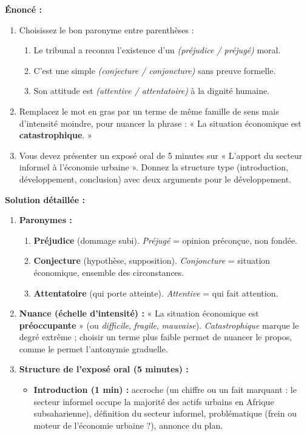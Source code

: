 \documentclass[11pt]{article}
\begin{document}
\begin{exoresolu}
\textbf{Énoncé :}
\begin{enumerate}
    \item Choisissez le bon paronyme entre parenthèses :
    \begin{enumerate}
        \item Le tribunal a reconnu l'existence d'un \emph{(préjudice / préjugé)} moral.
        \item C'est une simple \emph{(conjecture / conjoncture)} sans preuve formelle.
        \item Son attitude est \emph{(attentive / attentatoire)} à la dignité humaine.
    \end{enumerate}
    \item Remplacez le mot en gras par un terme de même famille de sens mais d'intensité moindre, pour nuancer la phrase : « La situation économique est \textbf{catastrophique}. »
    \item Vous devez présenter un exposé oral de 5 minutes sur « L'apport du secteur informel à l'économie urbaine ». Donnez la structure type (introduction, développement, conclusion) avec deux arguments pour le développement.
\end{enumerate}
\tcblower
\textbf{Solution détaillée :}
\begin{enumerate}
    \item \textbf{Paronymes :}
    \begin{enumerate}
        \item \textbf{Préjudice} (dommage subi). \emph{Préjugé} = opinion préconçue, non fondée.
        \item \textbf{Conjecture} (hypothèse, supposition). \emph{Conjoncture} = situation économique, ensemble des circonstances.
        \item \textbf{Attentatoire} (qui porte atteinte). \emph{Attentive} = qui fait attention.
    \end{enumerate}
    \item \textbf{Nuance (échelle d'intensité) :} « La situation économique est \textbf{préoccupante} » (ou \emph{difficile}, \emph{fragile}, \emph{mauvaise}). \emph{Catastrophique} marque le degré extrême ; choisir un terme plus faible permet de nuancer le propos, comme le permet l'antonymie graduelle.
    \item \textbf{Structure de l'exposé oral (5 minutes) :}
    \begin{itemize}
        \item \textbf{Introduction (1 min) :} accroche (un chiffre ou un fait marquant : le secteur informel occupe la majorité des actifs urbains en Afrique subsaharienne), définition du secteur informel, problématique (frein ou moteur de l'économie urbaine ?), annonce du plan.

\end{itemize}
\end{enumerate}
\end{exoresolu}
\end{document}
